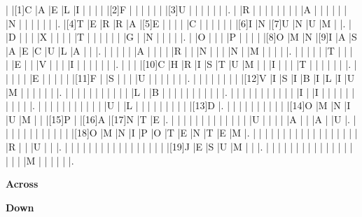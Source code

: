 \documentclass{article}
\begin{document}
\begin{Puzzle}{24}{19}
|{} |[1]C |A |E |L |I |{} |{} |{} |{} |[2]F |{} |{} |{} |{} |{} |{} |[3]U |{} |{} |{} |{} |{} |{} |.
|{} |R |{} |{} |{} |{} |{} |{} |{} |{} |A |{} |{} |{} |{} |{} |{} |N |{} |{} |{} |{} |{} |{} |.
|[4]T |E |R |R |A |[5]E |{} |{} |{} |{} |C |{} |{} |{} |{} |{} |{} |[6]I |N |[7]U |N |U |M |{} |.
|{} |D |{} |{} |{} |X |{} |{} |{} |{} |T |{} |{} |{} |{} |{} |{} |G |{} |N |{} |{} |{} |{} |.
|{} |O |{} |{} |{} |P |{} |{} |{} |{} |[8]O |M |N |[9]I |A |S |A |E |C |U |L |A |{} |{} |.
|{} |{} |{} |{} |{} |A |{} |{} |{} |{} |R |{} |{} |N |{} |{} |{} |N |{} |M |{} |{} |{} |{} |.
|{} |{} |{} |{} |{} |T |{} |{} |{} |{} |E |{} |{} |V |{} |{} |{} |I |{} |{} |{} |{} |{} |{} |.
|{} |{} |{} |[10]C |H |R |I |S |T |U |M |{} |{} |I |{} |{} |{} |T |{} |{} |{} |{} |{} |{} |.
|{} |{} |{} |{} |{} |E |{} |{} |{} |{} |{} |[11]F |{} |S |{} |{} |{} |U |{} |{} |{} |{} |{} |{} |.
|{} |{} |{} |{} |{} |{} |{} |{} |[12]V |I |S |I |B |I |L |I |U |M |{} |{} |{} |{} |{} |{} |.
|{} |{} |{} |{} |{} |{} |{} |{} |{} |{} |{} |L |{} |B |{} |{} |{} |{} |{} |{} |{} |{} |{} |{} |.
|{} |{} |{} |{} |{} |{} |{} |{} |{} |{} |{} |I |{} |I |{} |{} |{} |{} |{} |{} |{} |{} |{} |{} |.
|{} |{} |{} |{} |{} |{} |{} |{} |{} |{} |{} |U |{} |L |{} |{} |{} |{} |{} |{} |{} |{} |{} |[13]D |.
|{} |{} |{} |{} |{} |{} |{} |{} |{} |{} |[14]O |M |N |I |U |M |{} |{} |[15]P |{} |[16]A |[17]N |T |E |.
|{} |{} |{} |{} |{} |{} |{} |{} |{} |{} |{} |{} |{} |U |{} |{} |{} |{} |A |{} |{} |A |{} |U |.
|{} |{} |{} |{} |{} |{} |{} |{} |{} |{} |{} |{} |[18]O |M |N |I |P |O |T |E |N |T |E |M |.
|{} |{} |{} |{} |{} |{} |{} |{} |{} |{} |{} |{} |{} |{} |{} |{} |{} |{} |R |{} |{} |U |{} |{} |.
|{} |{} |{} |{} |{} |{} |{} |{} |{} |{} |{} |{} |{} |{} |{} |{} |{} |[19]J |E |S |U |M |{} |{} |.
|{} |{} |{} |{} |{} |{} |{} |{} |{} |{} |{} |{} |{} |{} |{} |{} |{} |{} |M |{} |{} |{} |{} |{} |.
\end{Puzzle}
\begin{PuzzleClues}{\textbf{Across}}
\end{PuzzleClues}

\begin{PuzzleClues}{\textbf{Down}}
\end{PuzzleClues}
\end{document}
